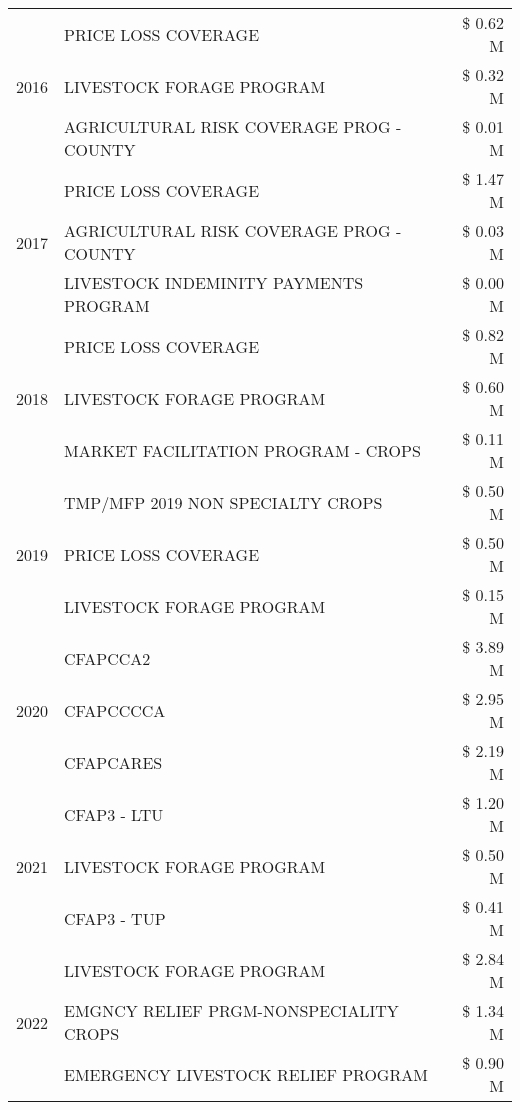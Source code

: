 \begin{tabular}{llr}
\cline{1-3}
\multirow[t]{3}{*}{2016} & PRICE LOSS COVERAGE & \$ 0.62 M \\
 & LIVESTOCK FORAGE PROGRAM & \$ 0.32 M \\
 & AGRICULTURAL RISK COVERAGE PROG - COUNTY & \$ 0.01 M \\
\cline{1-3}
\multirow[t]{3}{*}{2017} & PRICE LOSS COVERAGE & \$ 1.47 M \\
 & AGRICULTURAL RISK COVERAGE PROG - COUNTY & \$ 0.03 M \\
 & LIVESTOCK INDEMINITY PAYMENTS PROGRAM & \$ 0.00 M \\
\cline{1-3}
\multirow[t]{3}{*}{2018} & PRICE LOSS COVERAGE & \$ 0.82 M \\
 & LIVESTOCK FORAGE PROGRAM & \$ 0.60 M \\
 & MARKET FACILITATION PROGRAM - CROPS & \$ 0.11 M \\
\cline{1-3}
\multirow[t]{3}{*}{2019} & TMP/MFP 2019 NON SPECIALTY CROPS & \$ 0.50 M \\
 & PRICE LOSS COVERAGE & \$ 0.50 M \\
 & LIVESTOCK FORAGE PROGRAM & \$ 0.15 M \\
\cline{1-3}
\multirow[t]{3}{*}{2020} & CFAPCCA2 & \$ 3.89 M \\
 & CFAPCCCCA & \$ 2.95 M \\
 & CFAPCARES & \$ 2.19 M \\
\cline{1-3}
\multirow[t]{3}{*}{2021} & CFAP3 - LTU & \$ 1.20 M \\
 & LIVESTOCK FORAGE PROGRAM & \$ 0.50 M \\
 & CFAP3 - TUP & \$ 0.41 M \\
\cline{1-3}
\multirow[t]{3}{*}{2022} & LIVESTOCK FORAGE PROGRAM & \$ 2.84 M \\
 & EMGNCY RELIEF PRGM-NONSPECIALITY CROPS & \$ 1.34 M \\
 & EMERGENCY LIVESTOCK RELIEF PROGRAM & \$ 0.90 M \\
\cline{1-3}
\bottomrule
\end{tabular}
